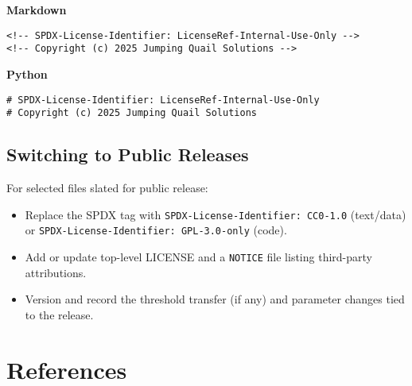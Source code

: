 \documentclass[12pt,a4paper]{article}
\begin{document}
\noindent\textbf{Markdown}
\begin{lstlisting}[style=code]
<!-- SPDX-License-Identifier: LicenseRef-Internal-Use-Only -->
<!-- Copyright (c) 2025 Jumping Quail Solutions -->
\end{lstlisting}

\noindent\textbf{Python}
\begin{lstlisting}[style=code]
# SPDX-License-Identifier: LicenseRef-Internal-Use-Only
# Copyright (c) 2025 Jumping Quail Solutions
\end{lstlisting}

\subsection*{Switching to Public Releases}
For selected files slated for public release:
\begin{itemize}[leftmargin=*]
  \item Replace the SPDX tag with \texttt{SPDX-License-Identifier: CC0-1.0} (text/data) or \texttt{SPDX-License-Identifier: GPL-3.0-only} (code).
  \item Add or update top-level LICENSE and a \texttt{NOTICE} file listing third-party attributions.
  \item Version and record the threshold transfer (if any) and parameter changes tied to the release.
\end{itemize}

\section*{References}
% 
% 
\end{document}
